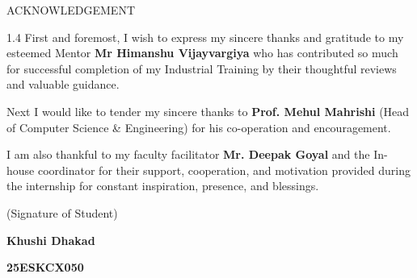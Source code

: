 \thispagestyle{plain}

\begin{center}
{\HeadingFont ACKNOWLEDGEMENT}
\end{center}

\vspace{1.0cm}

\begin{spacing}{1.4}
\justifying
\noindent
First and foremost, I wish to express my sincere thanks and gratitude to my esteemed Mentor \textbf{Mr Himanshu Vijayvargiya} who has contributed so much for successful completion of my Industrial Training by their thoughtful reviews and valuable guidance.

\vspace{0.6cm}
\noindent
Next I would like to tender my sincere thanks to \textbf{Prof. Mehul Mahrishi} (Head of Computer Science \& Engineering) for his co-operation and encouragement.

\vspace{0.6cm}
\noindent
I am also thankful to my faculty facilitator \textbf{Mr. Deepak Goyal} and the In-house coordinator for their support, cooperation, and motivation provided during the internship for constant inspiration, presence, and blessings.

\end{spacing}

\vspace{3.8cm}

\begin{flushright}

(Signature of Student)

\vspace{0.8cm}

\textbf{Khushi Dhakad}

\vspace{0.6cm}

\textbf{25ESKCX050}

\end{flushright}
